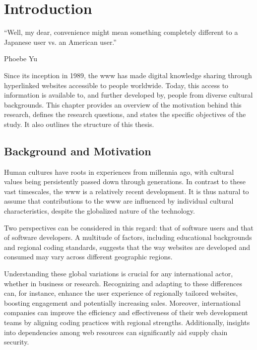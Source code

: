 \section{Introduction}
\label{sec:intro}

\epigraph{
    ``Well, my dear, convenience might mean something completely different to a Japanese user vs. an American user.''
}{
    Phoebe Yu~\cite{Yu2024}
}

Since its inception in 1989, the \ac{www} has made digital knowledge sharing through hyperlinked websites accessible to people worldwide.
Today, this access to information is available to, and further developed by, people from diverse cultural backgrounds.
This chapter provides an overview of the motivation behind this research, defines the research questions, and states the specific objectives of the study.
It also outlines the structure of this thesis.

\subsection{Background and Motivation}
\label{sec:intro-background-and-motivation}

Human cultures have roots in experiences from millennia ago, with cultural values being persistently passed down through generations.
In contrast to these vast timescales, the \ac{www} is a relatively recent development.
It is thus natural to assume that contributions to the \ac{www} are influenced by individual cultural characteristics, despite the globalized nature of the technology.

Two perspectives can be considered in this regard: that of software users and that of software developers.
A multitude of factors, including educational backgrounds and regional coding standards, suggests that the way websites are developed and consumed may vary across different geographic regions.

Understanding these global variations is crucial for any international actor, whether in business or research.
Recognizing and adapting to these differences can, for instance, enhance the user experience of regionally tailored websites, boosting engagement and potentially increasing sales.
Moreover, international companies can improve the efficiency and effectiveness of their web development teams by aligning coding practices with regional strengths.
Additionally, insights into dependencies among web resources can significantly aid supply chain security.


